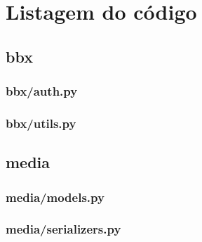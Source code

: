 \newcommand{\codeFolder}{../../tests/django-backbone_0}
                   
\chapter{Listagem do código}
\label{ApendiceA}

\section{bbx}

\subsection{bbx/auth.py}


\subsection{bbx/utils.py}


\section{media}

%

%

\subsection{media/models.py}


\subsection{media/serializers.py}


